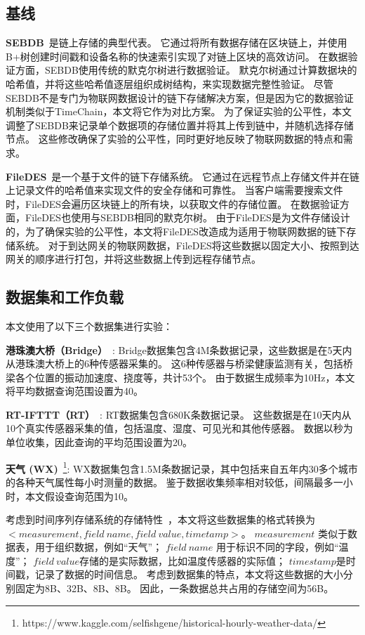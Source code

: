 \subsection{基线}
\textbf{SEBDB}~\cite{zhu2019sebdb}是链上存储的典型代表。
它通过将所有数据存储在区块链上，并使用B+树创建时间戳和设备名称的快速索引实现了对链上区块的高效访问。
在数据验证方面，SEBDB使用传统的默克尔树进行数据验证。
默克尔树通过计算数据块的哈希值，并将这些哈希值逐层组织成树结构，来实现数据完整性验证。
尽管SEBDB不是专门为物联网数据设计的链下存储解决方案，但是因为它的数据验证机制类似于TimeChain，本文将它作为对比方案。
为了保证实验的公平性，本文调整了SEBDB来记录单个数据项的存储位置并将其上传到链中，并随机选择存储节点。
这些修改确保了实验的公平性，同时更好地反映了物联网数据的特点和需求。

\textbf{FileDES}~\cite{xu2024filedes}是一个基于文件的链下存储系统。
它通过在远程节点上存储文件并在链上记录文件的哈希值来实现文件的安全存储和可靠性。
当客户端需要搜索文件时，FileDES会遍历区块链上的所有块，以获取文件的存储位置。
在数据验证方面，FileDES也使用与SEBDB相同的默克尔树。
由于FileDES是为文件存储设计的，为了确保实验的公平性，本文将FileDES改造成为适用于物联网数据的链下存储系统。
对于到达网关的物联网数据，FileDES将这些数据以固定大小、按照到达网关的顺序进行打包，并将这些数据上传到远程存储节点。

\subsection{数据集和工作负载}

本文使用了以下三个数据集进行实验：

\textbf{港珠澳大桥（Bridge）}~\cite{zhang2023edge}:
Bridge数据集包含4M条数据记录，这些数据是在5天内从港珠澳大桥上的6种传感器采集的。
这6种传感器与桥梁健康监测有关，包括桥梁各个位置的振动加速度、挠度等，共计53个。
由于数据生成频率为10Hz，本文将平均数据查询范围设置为40。

\textbf{RT-IFTTT（RT）}~\cite{heo2017rt}:
RT数据集包含680K条数据记录。
这些数据是在10天内从10个真实传感器采集的值，包括温度、湿度、可见光和其他传感器。
数据以秒为单位收集，因此查询的平均范围设置为20。

\textbf{天气 (WX)}~\footnote{https://www.kaggle.com/selfishgene/historical-hourly-weather-data/}:
WX数据集包含1.5M条数据记录，其中包括来自五年内30多个城市的各种天气属性每小时测量的数据。
鉴于数据收集频率相对较低，间隔最多一小时，本文假设查询范围为10。

考虑到时间序列存储系统的存储特性~\cite{naqvi2017time}，本文将这些数据集的格式转换为\\ $<measurement, field~name, field~value, timetamp>$。
$measurement$ 类似于数据表，用于组织数据，例如“天气”；
$field~name$ 用于标识不同的字段，例如“温度”；
$field~value$存储的是实际数据，比如温度传感器的实际值；
$timestamp$是时间戳，记录了数据的时间信息。
考虑到数据集的特点，本文将这些数据的大小分别固定为8B、32B、8B、8B。
因此，一条数据总共占用的存储空间为56B。


